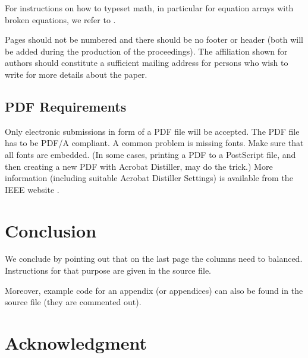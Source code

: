\documentclass[conference,letterpaper]{IEEEtran}
\begin{document}
For instructions on how to typeset math, in particular for equation
arrays with broken equations, we refer to \cite{typesetmoser}.

Pages should not be numbered and there should be no footer or header
(both will be added during the production of the proceedings). The
affiliation shown for authors should constitute a sufficient mailing
address for persons who wish to write for more details about the
paper.


\subsection{PDF Requirements}

Only electronic submissions in form of a PDF file will be
accepted. The PDF file has to be PDF/A compliant. A common problem is
missing fonts. Make sure that all fonts are embedded. (In some cases,
printing a PDF to a PostScript file, and then creating a new PDF with
Acrobat Distiller, may do the trick.) More information (including
suitable Acrobat Distiller Settings) is available from the IEEE
website \cite{IEEE:pdfsettings, IEEE:AuthorToolbox}.


\section{Conclusion}\label{sec:con}

We conclude by pointing out that on the last page the columns need to
balanced. Instructions for that purpose are given in the source file.

Moreover, example code for an appendix (or appendices) can also be
found in the source file (they are commented out).



\section*{Acknowledgment}



\end{document}
